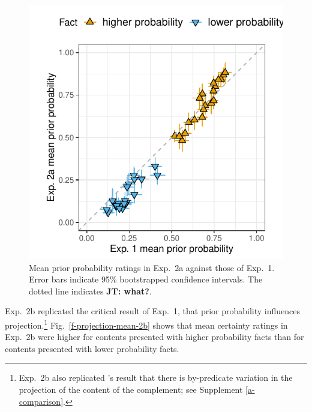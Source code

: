 \documentclass[11pt,fleqn]{article}
\newcommand{\jt}[1]{\textbf{\color{blue}JT: #1}}
\newcommand{\figref}[1]{Fig.~\ref{#1}}
\newcommand{\6}{\mbox{$[\hspace*{-.6mm}[$}}
\newcommand{\9}{\mbox{$]\hspace*{-.6mm}]$}}
\newcommand{\citepos}[1]{\citeauthor{#1}'s \citeyear{#1}}
\begin{document}
\begin{figure}[h!]
\centering

\includegraphics[width=.4\paperwidth]{../../results/1-prior/graphs/prior-probability-comparison-exp1-exp2}

\caption{Mean prior probability ratings in Exp.~2a against those of Exp.~1. Error bars indicate 95\% bootstrapped confidence intervals. The dotted line indicates \jt{what?}.}
\label{f-prior-comparison}
\end{figure}

Exp.~2b replicated the critical result of Exp.~1, that prior probability influences projection.\footnote{Exp.~2b also replicated \citepos{tonhauser-degen-factive} result that there is by-predicate variation in the projection of the content of the complement; see Supplement \ref{a-comparison}.}  \figref{f-projection-mean-2b} shows that mean certainty ratings in Exp.~2b were higher for contents presented with higher probability facts than for contents presented with lower probability facts.
\end{document}
